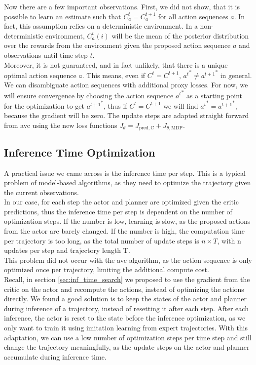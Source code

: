 Now there are a few important observations. First, we did not show, that it is possible to learn an estimate such that $C_a^t = C_a^{t+1}$ for all action sequences $a$. 
In fact, this assumption relies on a deterministic 
environment. In a non-deterministic environment, $C_a^t(i)$ will be the mean of the posterior distribution over the rewards from the environment given the proposed action sequence $a$ 
and observations until time step $t$. \\

Moreover, it is not guaranteed, and in fact unlikely, that there is a unique optimal action sequence $a$. This means, even if $C^t = C^{t+1}$, ${a^t}^* \neq {a^{t+1}}^*$ in general. We can 
disambiguate action sequences with additional proxy losses. 
For now, we will ensure convergence by choosing the action sequence ${a^t}^*$ as a starting point for the optimization to get ${a^{t+1}}^*$, thus if $C^t = C^{t+1}$ we will find 
${a^t}^* = {a^{t+1}}^*$, because the gradient will be zero. 
The update 
steps are adapted straight forward from \ac{avc} using the new loss functions $J_{\theta} = J_{\mathrm{pred, C}} + J_{\theta, \mathrm{MDP}}$. 

\subsection{Inference Time Optimization}
A practical issue we came across is the inference time per step. This is a typical problem of model-based algorithms, as they need to optimize the trajectory given 
the current observations.\\ 

In our case, for each step the actor and planner are optimized given the critic predictions, thus the inference time 
per step is dependent on the number of optimization steps. If the number is low, learning is slow, as the proposed actions from the actor are barely changed. 
If the number is high, the computation time per trajectory is too long, as the total number of update steps is $n \times T$, with n updates per step and trajectory length 
T.\\ 

This problem did not occur with the \ac{avc} algorithm, as the action sequence is only optimized 
once per trajectory, limiting the additional compute cost.\\

Recall, in section \ref{sec:inf_time_search} we proposed to use the gradient from the critic on the actor and recompute the 
actions, instead of optimizing the actions directly. We found a good solution is to keep the states of the actor and planner during inference of a trajectory, 
instead of resetting it after each step. After each inference, the actor is reset to the state before the inference optimization, as we only want to 
train it using imitation learning from expert trajectories. With this adaptation, we can use a low number of optimization steps per time step and still change the trajectory meaningfully, 
as the update steps on the actor and planner accumulate during inference time.
     
